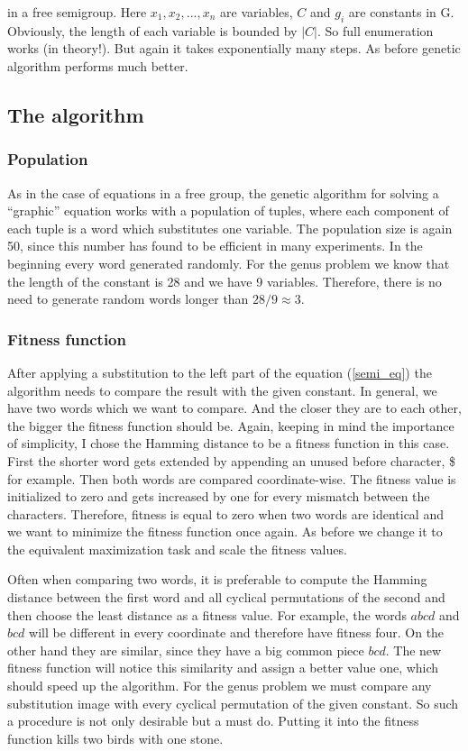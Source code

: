 \documentclass{article}
\begin{document}
\noindent
in a free semigroup. Here $x_1,x_2,...,x_n$ are variables, $C$ and $g_i$
are constants in G. Obviously, the length of each variable is bounded
by $|C|$. So full enumeration works (in theory!). But again it takes
exponentially many steps. As before genetic algorithm performs much
better.


  \subsection{The algorithm}

    \subsubsection{Population}

As in the case of equations in a free group, the genetic algorithm for
solving a ``graphic'' equation works with a population of tuples,
where each component of each tuple is a word which substitutes one
variable. The population size is again 50, since this number has found
to be efficient in many experiments. In the beginning every word
generated randomly. For the genus problem we know that the length of
the constant is 28 and we have 9 variables. Therefore, there is no
need to generate random words longer than $28/9 \approx 3$.

    \subsubsection{Fitness function}

After applying a substitution to the left part of the equation
(\ref{semi_eq}) the algorithm needs to compare the result with the
given constant. In general, we have two words which we want to
compare. And the closer they are to each other, the bigger the
fitness function should be. Again, keeping in mind the importance of
simplicity, I chose the Hamming distance to be a fitness function in
this case. First the shorter word gets extended by appending an unused
before character, \$ for example. Then both words are compared
coordinate-wise. The fitness value is initialized to zero and gets
increased by one for every mismatch between the characters. Therefore,
fitness is equal to zero when two words are identical and we want to
minimize the fitness function once again. As before we change it to
the equivalent maximization task and scale the fitness values.

Often when comparing two words, it is preferable to compute the
Hamming distance between the first word and all cyclical permutations
of the second and then choose the least distance as a fitness
value. For example, the words $a b c d$ and $b c d$ will be different
in every coordinate and therefore have fitness four. On the other hand
they are similar, since they have a big common piece $b c d$. The new
fitness function will notice this similarity and assign a better value
one, which should speed up the algorithm. For the genus problem we
must compare any substitution image with every cyclical permutation of
the given constant. So such a procedure is not only desirable but a
must do. Putting it into the fitness function kills two birds with one
stone.
\end{document}
